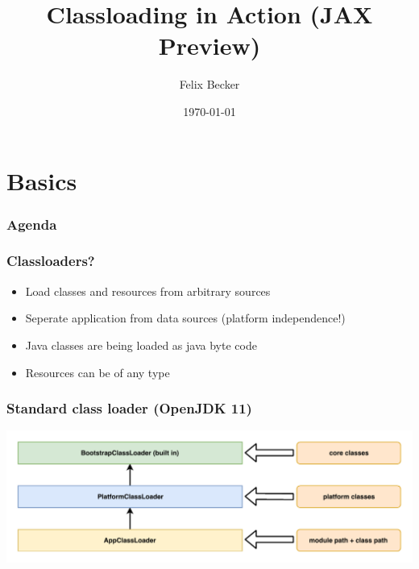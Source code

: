 \documentclass[aspectratio=169]{beamer}
\title{Classloading in Action (JAX Preview)}
\author{Felix Becker}
\date{\today}
\institute{REWE Systems}
\begin{document}
\maketitle

\section{Basics}

\begin{frame}
	\frametitle{Agenda}
	\tableofcontents
\end{frame}

\begin{frame}
	\frametitle{Classloaders?}
	\begin{itemize}
		\item{Load classes and resources from arbitrary sources}
		\item{Seperate application from data sources (platform independence!)}
		\item{Java classes are being loaded as java byte code}
		\item{Resources can be of any type}
	\end{itemize}
\end{frame}

\begin{frame}
	\frametitle{Standard class loader (OpenJDK 11)}
	\begin{center}
	    \includegraphics[scale=0.7]{assets/AllGraphicsTalk-classloader.pdf}
	\end{center}
\end{frame}
\end{document}
